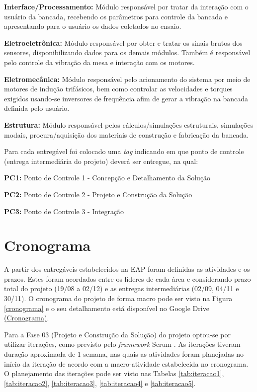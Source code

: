 \textbf{Interface/Processamento:} Módulo responsável por tratar da interação com o usuário da bancada, recebendo os parâmetros para controle da bancada e apresentando para o usuário os dados coletados no ensaio.

\textbf{Eletroeletrônica:} Módulo responsável por obter e tratar os sinais brutos dos sensores, disponibilizando dados para os demais módulos. Também é responsável pelo controle da vibração da mesa e interação com os motores.

\textbf{Eletromecânica:} Módulo responsável pelo acionamento do sistema por meio de motores de indução trifásicos, bem como controlar as velocidades e torques exigidos usando-se inversores de frequência afim de gerar a vibração na bancada definida pelo usuário.

\textbf{Estrutura:} Módulo responsável pelos cálculos/simulações estruturais, simulações modais, procura/aquisição dos materiais de construção e fabricação da bancada.

Para cada entregável foi colocado uma \textit{tag} indicando em que ponto de controle (entrega intermediária do projeto) deverá ser entregue, na qual:

\indent \textbf{PC1:} Ponto de Controle 1 - Concepção e Detalhamento da Solução

\indent \textbf{PC2:} Ponto de Controle 2 - Projeto e Construção da Solução

\indent \textbf{PC3:} Ponto de Controle 3 - Integração

\section*{Cronograma}

A partir dos entregáveis estabelecidos na EAP foram definidas as atividades e os prazos. Estes foram acordados entre os líderes de 
cada área e considerando prazo total do projeto (19/08 a 02/12) e as entregas intermediárias (02/09, 04/11 e 30/11).
O cronograma do projeto de forma macro pode ser visto na Figura \ref{cronograma} e o seu detalhamento está disponível
no Google Drive \href{https://drive.google.com/file/d/0B28JW3Vcm0jLdElSSGNPcU4yVEU/view?usp=sharing}{(Cronograma)}.

Para a Fase 03 (Projeto e Construção da Solução) do projeto optou-se por utilizar iterações, como previsto pelo 
\textit{framework} Scrum \cite{scrum}.
As iterações tiveram duração aproximada de 1 semana, 
nas quais as atividades foram planejadas no início da iteração de acordo 
com a macro-atividade estabelecida no cronograma. O planejamento das iterações pode ser visto nas Tabelas \ref{tab:iteracao1},
\ref{tab:iteracao2}, \ref{tab:iteracao3}, \ref{tab:iteracao4} e \ref{tab:iteracao5}.

